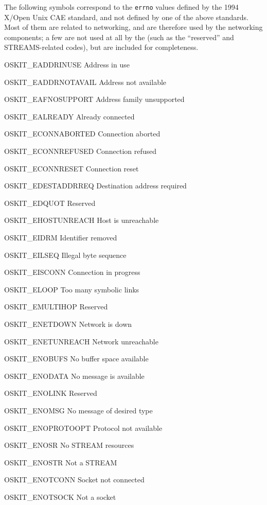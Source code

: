\begin{apidesc}
	The following symbols correspond to the \texttt{errno} values
	defined by the 1994 X/Open Unix CAE standard,
	and not defined by one of the above standards.
	Most of them are related to networking,
	and are therefore used by the \oskit{} networking components;
	a few are not used at all by the \oskit{}
	(such as the ``reserved'' and STREAMS-related codes),
	but are included for completeness.
	\begin{icsymlist}
	\item[OSKIT_EADDRINUSE]		Address in use
	\item[OSKIT_EADDRNOTAVAIL]	Address not available
	\item[OSKIT_EAFNOSUPPORT]	Address family unsupported
	\item[OSKIT_EALREADY]		Already connected
	\item[OSKIT_ECONNABORTED]	Connection aborted
	\item[OSKIT_ECONNREFUSED]	Connection refused
	\item[OSKIT_ECONNRESET]		Connection reset
	\item[OSKIT_EDESTADDRREQ]	Destination address required
	\item[OSKIT_EDQUOT]		Reserved
	\item[OSKIT_EHOSTUNREACH]	Host is unreachable
	\item[OSKIT_EIDRM]		Identifier removed
	\item[OSKIT_EILSEQ]		Illegal byte sequence
	\item[OSKIT_EISCONN]		Connection in progress
	\item[OSKIT_ELOOP]		Too many symbolic links
	\item[OSKIT_EMULTIHOP]		Reserved
	\item[OSKIT_ENETDOWN]		Network is down
	\item[OSKIT_ENETUNREACH]		Network unreachable
	\item[OSKIT_ENOBUFS]		No buffer space available
	\item[OSKIT_ENODATA]		No message is available
	\item[OSKIT_ENOLINK]		Reserved
	\item[OSKIT_ENOMSG]		No message of desired type
	\item[OSKIT_ENOPROTOOPT]		Protocol not available
	\item[OSKIT_ENOSR]		No STREAM resources
	\item[OSKIT_ENOSTR]		Not a STREAM
	\item[OSKIT_ENOTCONN]		Socket not connected
	\item[OSKIT_ENOTSOCK]		Not a socket

\end{icsymlist}
\end{apidesc}
